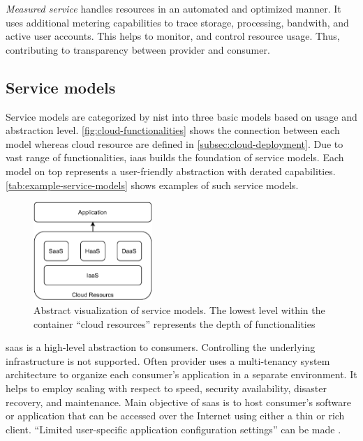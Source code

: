 \textit{Measured service} handles resources in an automated and optimized manner. It uses additional metering capabilities to trace storage, processing, bandwith, and active user accounts. This helps to monitor, and control resource usage. Thus, contributing to transparency between provider and consumer.

\subsection{Service models}
\label{subsec:cloud-service}

Service models are categorized by \ac{nist} into three basic models based on usage and abstraction level. \autoref{fig:cloud-functionalities} shows the connection between each model whereas cloud resource are defined in \autoref{subsec:cloud-deployment}. Due to vast range of functionalities, \ac*{iaas} builds the foundation of service models. Each model on top represents a user-friendly abstraction with derated capabilities. \autoref{tab:example-service-models} shows examples of such service models.

\begin{figure}[h]
    \centering
    \includegraphics[width=0.4\textwidth]{figures/cloud-functionalities.pdf}
    \caption[Abstract visualization of service models]{Abstract visualization of service models. The lowest level within the container \enquote{cloud resources} represents the depth of functionalities}
    \label{fig:cloud-functionalities}
\end{figure}

\ac{saas} is a high-level abstraction to consumers. Controlling the underlying infrastructure is not supported. Often provider uses a multi-tenancy system architecture to organize each consumer's application in a separate environment. It helps to employ scaling with respect to speed, security availability, disaster recovery, and maintenance. Main objective of \ac{saas} is to host consumer's software or application that can be accessed over the Internet using either a thin or rich client.\cite{Dillon2010} \enquote{Limited user-specific application configuration settings} can be made \cite{Mell2011}.\\


